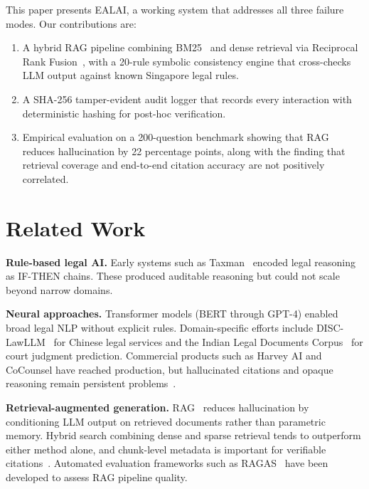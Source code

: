 \documentclass[runningheads]{llncs}
\let\oldsection\section
\renewcommand{\section}{\clearpage\oldsection}
\begin{document}
This paper presents EALAI, a working system that addresses all three failure modes.
Our contributions are:

\begin{enumerate}
  \item A hybrid RAG pipeline combining BM25~\cite{b11} and dense retrieval via
        Reciprocal Rank Fusion~\cite{b12}, with a 20-rule symbolic consistency engine
        that cross-checks LLM output against known Singapore legal rules.
  \item A SHA-256 tamper-evident audit logger that records every interaction with
        deterministic hashing for post-hoc verification.
  \item Empirical evaluation on a 200-question benchmark showing that RAG reduces
        hallucination by 22 percentage points, along with the finding that retrieval
        coverage and end-to-end citation accuracy are not positively correlated.
\end{enumerate}

\section{Related Work}

\textbf{Rule-based legal AI.}
Early systems such as Taxman~\cite{b9} encoded legal reasoning as IF-THEN
chains. These produced auditable reasoning but could not scale beyond narrow
domains.

\textbf{Neural approaches.}
Transformer models (BERT through GPT-4) enabled broad legal NLP without explicit
rules. Domain-specific efforts include DISC-LawLLM~\cite{b14} for Chinese legal
services and the Indian Legal Documents Corpus~\cite{b15} for court judgment
prediction. Commercial products such as Harvey AI and CoCounsel have reached
production, but hallucinated citations and opaque reasoning remain
persistent problems~\cite{b1,b8}.

\textbf{Retrieval-augmented generation.}
RAG~\cite{b10} reduces hallucination by conditioning LLM output on retrieved
documents rather than parametric memory. Hybrid search combining dense and sparse
retrieval tends to outperform either method alone, and chunk-level metadata is
important for verifiable citations~\cite{b7}. Automated evaluation frameworks such as
RAGAS~\cite{b13} have been developed to assess RAG pipeline quality.
\end{document}
